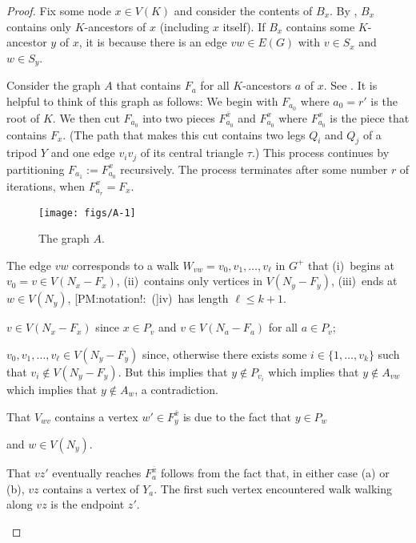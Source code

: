 \documentclass{patmorin}
\newcommand{\note}[2]{{\color{red}[#1:~#2]}}
\begin{document}
\begin{proof}
  Fix some node $x\in V(K)$ and consider the contents of $B_x$.  By , $B_x$ contains only $K$-ancestors of $x$ (including $x$ itself). If $B_x$ contains some $K$-ancestor $y$ of $x$, it is because there is an edge $vw\in E(G)$ with $v\in S_x$ and $w\in S_y$.   

  Consider the graph $A$ that contains $F_{a}$ for all $K$-ancestors $a$ of $x$. See .  It is helpful to think of this graph as follows:  We begin with $F_{a_0}$ where $a_0=r'$ is the root of $K$.  We then cut $F_{a_0}$ into two pieces $F^{\bar{x}}_{a_0}$ and $F^x_{a_0}$ where $F^x_{a_0}$ is the piece that contains $F_x$. (The path that makes this cut contains two legs $Q_i$ and $Q_j$ of a tripod $Y$ and one edge $v_iv_j$ of its central triangle $\tau$.)  This process continues by partitioning $F_{a_1}:=F^x_{a_0}$ recursively.  The process terminates after some number $r$ of iterations, when $F^x_{a_r}=F_x$.

  \begin{figure}
    \begin{center}
        \texttt{[image: figs/A-1]}
    \end{center}
    \caption{The graph $A$.}
  \end{figure}

  The edge $vw$ corresponds to a walk $W_{vw}=v_0,v_1,\ldots,v_{\ell}$ in $G^+$ that
  (i)~begins at $v_0=v\in V(N_x-F_x)$, (ii)~contains only vertices in $V(N_y-F_y)$, (iii)~ends at $w\in V(N_y)$, \note{PM:notation!} (iv)~has length $\ell\le k+1$.
  \begin{compactenum}[(i)]
    \item $v\in V(N_x-F_x)$ since $x\in P_v$ and $v\in V(N_a-F_a)$ for all $a\in P_v$;
    
    \item $v_0,v_1,\ldots,v_{\ell}\in V(N_y-F_y)$ since, otherwise there exists some $i\in\{1,\ldots,v_k\}$ such that $v_i\not\in V(N_y-F_y)$.  But this implies that $y\not\in P_{v_i}$ which implies that $y\not\in A_{vw}$ which implies that $y\not\in A_w$, a contradiction.

    \item That $V_{wv}$ contains a vertex $w'\in F^\bar{x}_{y}$ is due to the fact that $y\in P_w$ 
    
    
    and $w\in V(N_y)$.
    
    
    That $vz'$ eventually reaches $F^{\bar{x}}_a$ follows from the fact that, in either case (a) or (b), $vz$ contains a vertex of $Y_a$.  The first such vertex encountered walk walking along $vz$ is the endpoint $z'$.
    

\end{compactenum}
\end{proof}
\end{document}
